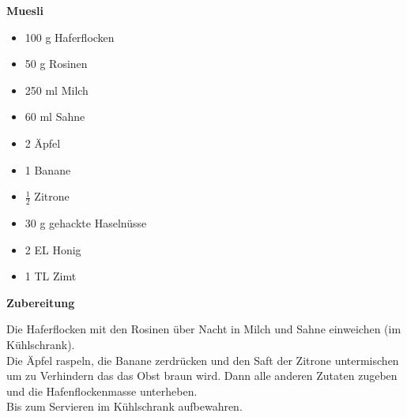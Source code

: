 
\parindent0pt	

\pagestyle{empty}


\textbf{{\LARGE Muesli}}%


\hrulefill
\vspace*{\fill}
\begin{multicols}{2}	


\begin{itemize}
\item 100 g Haferflocken
\item 50 g Rosinen
\item 250 ml Milch
\item 60 ml Sahne
\item 2 Äpfel 
\item 1 Banane
\item $\frac{1}{2}$ Zitrone
\item 30 g gehackte Haselnüsse
\item 2 EL Honig
\item 1 TL Zimt
\end{itemize}

\end{multicols}
\vfill
\newpage
\textbf{{\LARGE Zubereitung}}%

\hrulefill

\vspace*{\fill}
\begin{multicols}{2}

Die Haferflocken mit den Rosinen über Nacht in Milch und Sahne einweichen (im Kühlschrank).\\
Die Äpfel raspeln, die Banane zerdrücken und den Saft der Zitrone untermischen um zu Verhindern
das das Obst braun wird. Dann alle anderen Zutaten zugeben und die 
Hafenflockenmasse unterheben.\\

Bis zum Servieren im Kühlschrank aufbewahren.




\end{multicols}
\vfill
